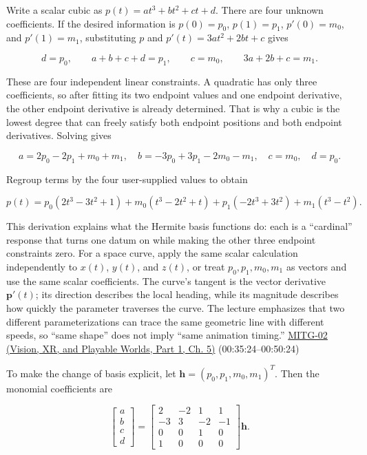 \hypertarget{03-visual-computing-i-ch001-why-endpoint-data-needs-a-cubic-and-how-the-conversion-works}{}

Write a scalar cubic as \(p(t)=at^3+bt^2+ct+d\). There are four unknown coefficients. If the desired information is \(p(0)=p_0\), \(p(1)=p_1\), \(p'(0)=m_0\), and \(p'(1)=m_1\), substituting \(p\) and \(p'(t)=3at^2+2bt+c\) gives

\[
d=p_0,\qquad a+b+c+d=p_1,\qquad c=m_0,\qquad 3a+2b+c=m_1.
\]

These are four independent linear constraints. A quadratic has only three coefficients, so after fitting its two endpoint values and one endpoint derivative, the other endpoint derivative is already determined. That is why a cubic is the lowest degree that can freely satisfy both endpoint positions and both endpoint derivatives. Solving gives

\[
a=2p_0-2p_1+m_0+m_1,\quad
b=-3p_0+3p_1-2m_0-m_1,\quad
c=m_0,\quad d=p_0.
\]

Regroup terms by the four user-supplied values to obtain

\[
p(t)=p_0(2t^3-3t^2+1)+m_0(t^3-2t^2+t)+p_1(-2t^3+3t^2)+m_1(t^3-t^2).
\]

This derivation explains what the Hermite basis functions do: each is a ``cardinal'' response that turns one datum on while making the other three endpoint constraints zero. For a space curve, apply the same scalar calculation independently to \(x(t)\), \(y(t)\), and \(z(t)\), or treat \(p_0,p_1,m_0,m_1\) as vectors and use the same scalar coefficients. The curve's tangent is the vector derivative \(\boldsymbol{p}'(t)\); its direction describes the local heading, while its magnitude describes how quickly the parameter traverses the curve. The lecture emphasizes that two different parameterizations can trace the same geometric line with different speeds, so ``same shape'' does not imply ``same animation timing.'' \href{../07-Vision-XR-and-Playable-Worlds-P01/main.pdf\#nameddest=04-visual-computing-ii-ch036-mitg-02---cubic-curves}{MITG-02 (Vision, XR, and Playable Worlds, Part 1, Ch. 5)} (00:35:24--00:50:24)

To make the change of basis explicit, let \(\mathbf{h}=(p_0,p_1,m_0,m_1)^T\). Then the monomial coefficients are

\[
\begin{bmatrix}a\\b\\c\\d\end{bmatrix}=
\begin{bmatrix}
2&-2&1&1\\
-3&3&-2&-1\\
0&0&1&0\\
1&0&0&0
\end{bmatrix}\mathbf{h}.
\]

